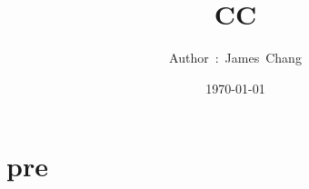 

\title{CC}
\author{ {\Biohazard} \hspace{1.5mm} \hspace{1.5mm} Author\ :\ James\ Chang}
\date{\today}


\large

\tableofcontents

\chapter{pre}




